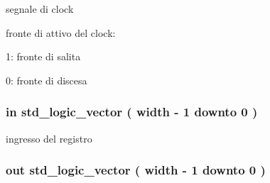 segnale di clock 

fronte di attivo del clock\+:
\begin{DoxyItemize}
\item \textquotesingle{}1\textquotesingle{}\+: fronte di salita
\item \textquotesingle{}0\textquotesingle{}\+: fronte di discesa 
\end{DoxyItemize}
\subsubsection[{\texorpdfstring{data\+\_\+in}{data_in}}]{ {\bfseries \textcolor{vhdlchar}{in}\textcolor{vhdlchar}{ }} {\bfseries \textcolor{vhdlchar}{std\+\_\+logic\+\_\+vector}\textcolor{vhdlchar}{ }\textcolor{vhdlchar}{(}\textcolor{vhdlchar}{ }\textcolor{vhdlchar}{ }\textcolor{vhdlchar}{ }\textcolor{vhdlchar}{ }{\bfseries {\bf width}} \textcolor{vhdlchar}{-\/}\textcolor{vhdlchar}{ } \textcolor{vhdldigit}{1} \textcolor{vhdlchar}{ }\textcolor{vhdlchar}{downto}\textcolor{vhdlchar}{ }\textcolor{vhdlchar}{ } \textcolor{vhdldigit}{0} \textcolor{vhdlchar}{ }\textcolor{vhdlchar}{)}\textcolor{vhdlchar}{ }} \hspace{0.3cm}{\ttfamily [Port]}}\hypertarget{group___generic_buffer_ga597910698848749da5951285c85fa4f9}{}\label{group___generic_buffer_ga597910698848749da5951285c85fa4f9}


ingresso del registro 

\subsubsection[{\texorpdfstring{data\+\_\+out}{data_out}}]{ {\bfseries \textcolor{vhdlchar}{out}\textcolor{vhdlchar}{ }} {\bfseries \textcolor{vhdlchar}{std\+\_\+logic\+\_\+vector}\textcolor{vhdlchar}{ }\textcolor{vhdlchar}{(}\textcolor{vhdlchar}{ }\textcolor{vhdlchar}{ }\textcolor{vhdlchar}{ }\textcolor{vhdlchar}{ }{\bfseries {\bf width}} \textcolor{vhdlchar}{-\/}\textcolor{vhdlchar}{ } \textcolor{vhdldigit}{1} \textcolor{vhdlchar}{ }\textcolor{vhdlchar}{downto}\textcolor{vhdlchar}{ }\textcolor{vhdlchar}{ } \textcolor{vhdldigit}{0} \textcolor{vhdlchar}{ }\textcolor{vhdlchar}{)}\textcolor{vhdlchar}{ }} \hspace{0.3cm}{\ttfamily [Port]}}\hypertarget{group___generic_buffer_ga0bf60a72cb11ffe1945b82ce0bb86a57}{}\label{group___generic_buffer_ga0bf60a72cb11ffe1945b82ce0bb86a57}


